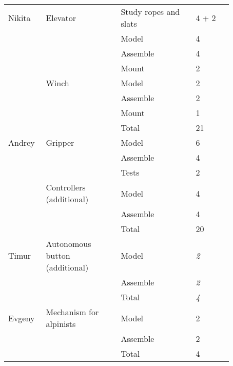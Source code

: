 \begin{table}[H]
\begin{center}
\begin{tabular}{|p{0.12\linewidth}|p{0.3\linewidth}|p{0.3\linewidth}|p{0.15\linewidth}|}
			Nikita	& Elevator	& Study ropes and slats	& 4 + 2 \\        
								& & Model &	4 \\
								& & Assemble & 4 \\                                  
								& & Mount & 2 \\
			\hline                                     
					& Winch 	& Model & 2 \\                               
								& & Assemble & 2 \\                                 
								& & Mount & 1 \\ 
			\hline                                   
			& & Total & 21 \\                                   
			\hline
			\hline                           
			                 
			Andrey & Gripper & Model & 6 \\                             
							& & Assemble & 4 \\                
							& & Tests & 2 \\  
			\hline
			& Controllers (additional) & Model & 4 \\                        
									   & & Assemble & 4 \\
			\hline                                  
			& & Total & 20 \\ 
			\hline
			\hline
			
			Timur & Autonomous button (additional)	& Model & \textit{2} \\                   
													 & & Assemble & \textit{2} \\  
			\hline                                  
			& & Total & \textit{4} \\ 
			\hline
			\hline
			           
			\hline
			Evgeny & Mechanism for alpinists & Model & 2 \\             
											 & & Assemble & 2 \\                                  
			\hline
			& & Total & 4 \\                             
			
			\hline
		\end{tabular}
	\end{center}
\end{table} 
